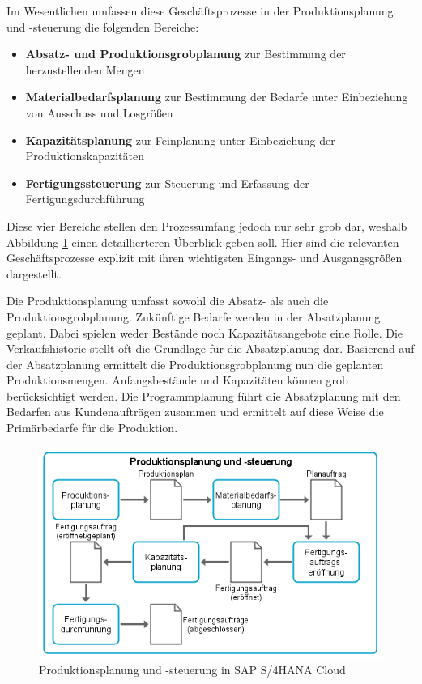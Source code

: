 Im Wesentlichen umfassen diese Geschäftsprozesse in der Produktionsplanung und -steuerung die folgenden Bereiche:

\begin{itemize}
    \item 
    \textbf{Absatz- und Produktionsgrobplanung} zur Bestimmung der herzustellenden Mengen
    \item 
    \textbf{Materialbedarfsplanung} zur Bestimmung der Bedarfe unter Einbeziehung von Ausschuss und Losgrößen
    \item 
    \textbf{Kapazitätsplanung} zur Feinplanung unter Einbeziehung der Produktionskapazitäten
    \item 
    \textbf{Fertigungssteuerung} zur Steuerung und Erfassung der Fertigungsdurchführung
\end{itemize}

Diese vier Bereiche stellen den Prozessumfang jedoch nur sehr grob dar, weshalb Abbildung \ref{fig:Prozessüberblick der Produktionsplanung und -steuerung} einen detaillierteren Überblick geben soll. Hier sind die relevanten Geschäftsprozesse explizit mit ihren wichtigsten Eingangs- und Ausgangsgrößen dargestellt.

Die Produktionsplanung umfasst sowohl die Absatz- als auch die Produktionsgrobplanung. Zukünftige Bedarfe werden in der Absatzplanung geplant. Dabei spielen weder Bestände noch Kapazitätsangebote eine Rolle. Die Verkaufshistorie stellt oft die Grundlage für die Absatzplanung dar. Basierend auf der Absatzplanung ermittelt die Produktionsgrobplanung nun die geplanten Produktionsmengen. Anfangsbestände und Kapazitäten können grob berücksichtigt werden. Die Programmplanung führt die Absatzplanung mit den Bedarfen aus Kundenaufträgen zusammen und ermittelt auf diese Weise die Primärbedarfe für die Produktion. 
\cite{Dickersbach.2014} 

\begin{figure}[H]
	\centering 
    \includegraphics[width=\textwidth]{img/Produktion.png}	
    \caption[Prozessüberblick der Produktionsplanung und -steuerung]
    {Produktionsplanung und -steuerung in SAP S/4HANA Cloud\protect\footnotemark}
    \label{fig:Prozessüberblick der Produktionsplanung und -steuerung}
\end{figure}

